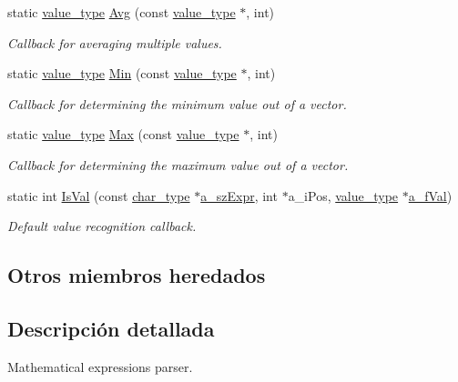 \begin{DoxyCompactItemize}
static \hyperlink{namespacemu_a17d4f113a4b88b8d971cca8ddbbe8a47}{value\+\_\+type} \hyperlink{classmu_1_1_parser_a77643bd7509ba6e1bc67357b89e90b4e}{Avg} (const \hyperlink{namespacemu_a17d4f113a4b88b8d971cca8ddbbe8a47}{value\+\_\+type} $\ast$, int)
\begin{DoxyCompactList}\small\item\em Callback for averaging multiple values. \end{DoxyCompactList}\item 
static \hyperlink{namespacemu_a17d4f113a4b88b8d971cca8ddbbe8a47}{value\+\_\+type} \hyperlink{classmu_1_1_parser_a806abd5be29fd98c6cf1e7bf1a88a606}{Min} (const \hyperlink{namespacemu_a17d4f113a4b88b8d971cca8ddbbe8a47}{value\+\_\+type} $\ast$, int)
\begin{DoxyCompactList}\small\item\em Callback for determining the minimum value out of a vector. \end{DoxyCompactList}\item 
static \hyperlink{namespacemu_a17d4f113a4b88b8d971cca8ddbbe8a47}{value\+\_\+type} \hyperlink{classmu_1_1_parser_ac396955a9fb9c60ef9c6d8276504f03a}{Max} (const \hyperlink{namespacemu_a17d4f113a4b88b8d971cca8ddbbe8a47}{value\+\_\+type} $\ast$, int)
\begin{DoxyCompactList}\small\item\em Callback for determining the maximum value out of a vector. \end{DoxyCompactList}\item 
static int \hyperlink{classmu_1_1_parser_aabcffb1cb1555f250e122ddaad2e458f}{Is\+Val} (const \hyperlink{namespacemu_a81cc89a81a8872430ab1799b5848c5ca}{char\+\_\+type} $\ast$\hyperlink{mu_parser_d_l_l_8h_a70627044ecb2b675fbd242e8bf1747b3}{a\+\_\+sz\+Expr}, int $\ast$a\+\_\+i\+Pos, \hyperlink{namespacemu_a17d4f113a4b88b8d971cca8ddbbe8a47}{value\+\_\+type} $\ast$\hyperlink{mu_parser_d_l_l_8h_a8ed6c2f8e84831a06620ad0546609ae6}{a\+\_\+f\+Val})
\begin{DoxyCompactList}\small\item\em Default value recognition callback. \end{DoxyCompactList}\end{DoxyCompactItemize}
\subsection*{Otros miembros heredados}


\subsection{Descripción detallada}
Mathematical expressions parser. 

